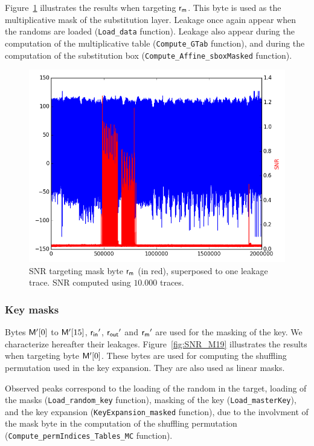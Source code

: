 Figure~\ref{fig:SNR_alpha} illustrates the results when targeting $\mathsf{r_m}$. This byte is used as the multiplicative mask of the substitution layer.
Leakage once again appear when the randoms are loaded (\texttt{Load\_data} function).
Leakage also appear during the computation of the multiplicative table (\texttt{Compute\_GTab} function), and during the computation of the substitution box (\texttt{Compute\_Affine\_sboxMasked} function).
\begin{figure}[H]
	\centering 
	\includegraphics[scale=0.35]{figures/2Mpts/SNR_M18_10ktraces.png}
	\caption{SNR targeting mask byte $\mathsf{r_m}$ (in red), superposed to one leakage trace. SNR computed using $10.000$ traces.}
	\label{fig:SNR_alpha}
\end{figure}

\subsubsection{Key masks}
Bytes $\mathsf{M'}[0]$ to $\mathsf{M'}[15]$, $\mathsf{r_{in}}'$, $\mathsf{r_{out}}'$ and $\mathsf{r_m}'$ are used for the masking of the key. We characterize hereafter their leakages.
Figure~\ref{fig:SNR_M19} illustrates the results when targeting byte $\mathsf{M'}[0]$. 
These bytes are used for computing the shuffling permutation used in the key expansion.
They are also used as linear masks.

Observed peaks correspond to the loading of the random in the target, loading of the masks (\texttt{Load\_random\_key} function), masking of the key (\texttt{Load\_masterKey}),
and the key expansion (\texttt{KeyExpansion\_masked} function), due to the involvment of the mask byte in the computation of the shuffling permutation\\ (\texttt{Compute\_permIndices\_Tables\_MC} function).

